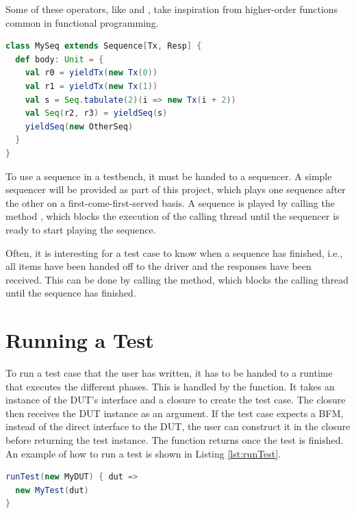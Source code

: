 Some of these operators, like  and , take inspiration from higher-order functions common in functional programming.

\begin{listing}
\begin{lstlisting}[language=scala, captionpos=b, caption=Example of a sequence producing four items of type \ttt{Tx} with responses of type \ttt{Resp}.,label=lst:sequence]
class MySeq extends Sequence[Tx, Resp] {
  def body: Unit = {
    val r0 = yieldTx(new Tx(0))
    val r1 = yieldTx(new Tx(1))
    val s = Seq.tabulate(2)(i => new Tx(i + 2))
    val Seq(r2, r3) = yieldSeq(s)
    yieldSeq(new OtherSeq)
  }
}
\end{lstlisting}
\end{listing}

To use a sequence in a testbench, it must be handed to a sequencer. A simple sequencer will be
provided as part of this project, which plays one sequence after the other on a first-come-first-served basis. A sequence is played by calling
the method , which blocks the execution of the calling thread until the sequencer is ready to start playing the sequence.

Often, it is interesting for a test case to know when a sequence has finished, i.e., all items have been handed off to
the driver and the responses have been received. This can be done by calling the  method, which blocks the calling thread until the sequence has finished.

\section{Running a Test} %

To run a test case that the user has written, it has to be handed to a runtime that executes the different
phases. This is handled by the  function. It takes an instance of the DUT's interface and a
closure to create the test case. The closure then receives the DUT instance as an argument. If the test case expects a
BFM, instead of the direct interface to the DUT, the user can construct it in the closure before returning the test
instance. The  function returns once the test is finished. An example of how to run a test is shown in
Listing \ref{lst:runTest}.

\begin{listing}
\begin{lstlisting}[language=scala, captionpos=b, caption=Example code for running a test case using the verification framework.,label=lst:runTest]
runTest(new MyDUT) { dut =>
  new MyTest(dut)
}
\end{lstlisting}
\end{listing}

